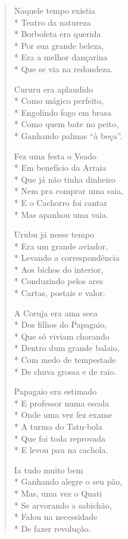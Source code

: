 \begin{verse}
Naquele tempo existia\\*
Teatro da natureza\\*
Borboleta era querida\\*
Por sua grande beleza,\\*
Era a melhor dançarina\\*
Que se via na redondeza.

Cururu era aplaudido\\*
Como mágico perfeito,\\*
Engolindo fogo em brasa\\*
Como quem bate no peito,\\*
Ganhando palmas “à beça”.

Fez uma festa o Veado\\*
Em benefício da Arraia\\*
Que já não tinha dinheiro\\*
Nem pra comprar uma saia,\\*
E o Cachorro foi cantar\\*
Mas apanhou uma vaia.

Urubu já nesse tempo\\*
Era um grande aviador,\\*
Levando a correspondência\\*
Aos bichos do interior,\\*
Conduzindo pelos ares\\*
Cartas, postais e valor.

A Coruja era ama seca\\*
Dos filhos do Papagaio,\\*
Que só viviam chorando\\*
Dentro dum grande balaio,\\*
Com medo de tempestade\\*
De chuva grossa e de raio.

Papagaio era estimado\\*
E professor numa escola\\*
Onde uma vez fez exame\\*
A turma do Tatu-bola\\*
Que foi toda reprovada\\*
E levou pau na cachola.

Ia tudo muito bem\\*
Ganhando alegre o seu pão,\\*
Mas, uma vez o Quati\\*
Se arvorando a sabichão,\\*
Falou na necessidade\\*
De fazer revolução.


\end{verse}
